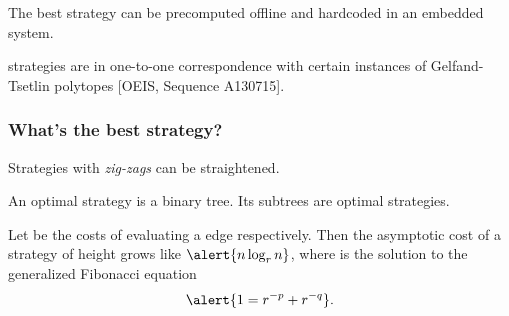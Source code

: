 \documentclass{beamer}
\renewcommand{\emph}[1]{}
\newcommand{\dottriangle}[2][\i-\j]{%
  \foreach \i in {0,...,#2} {%
    \foreach \j in {0,...,\i} {%
      \draw(\i,\j) node{#1};%
    }%
  }}
\begin{document}
\begin{frame}
  The best strategy can be \alert{precomputed} offline and
  \alert{hardcoded} in an embedded system.

  \begin{block}{}
    \emph{Funny fact:} strategies are in one-to-one correspondence with
    certain instances of Gelfand-Tsetlin polytopes [OEIS, Sequence
    A130715].
  \end{block}
\end{frame}


\begin{frame}
  \frametitle{What's the best strategy?}

  \begin{lemma}
    Strategies with \textit{zig-zags} can be straightened.
  \end{lemma}

  \begin{figure}
    \centering
  \end{figure}

  \begin{lemma}
    An optimal strategy is a binary tree. Its subtrees are optimal
    strategies.
  \end{lemma}

  \begin{corollary}
    Let \emph{$p,q$} be the costs of evaluating a \emph{left or right}
    edge respectively. Then the asymptotic cost of a strategy of
    height \emph{$n$} grows like $\alert{n\log_r n}$, where \emph{$r$}
    is the solution to the generalized Fibonacci
    equation \[\alert{1=r^{-p}+r^{-q}}.\]
  \end{corollary}
\end{frame}
\end{document}

